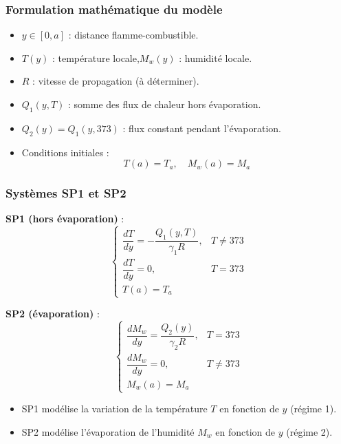 \documentclass[handout]{beamer}
\newtheorem{pbm et hypo}[thm]{Problématique et hypothèses}
\begin{document}
	
	\begin{frame}
		\frametitle{Formulation mathématique du modèle}
		
		\begin{itemize}
			\item $y \in [0,a]$ : distance flamme-combustible.
			\item $T(y)$ : température locale,\quad $M_w(y)$ : humidité locale.
			\item $R$ : vitesse de propagation (à déterminer).
			\item $Q_1(y,T)$ : somme des flux de chaleur hors évaporation.
			\item $Q_2(y) = Q_1(y, 373)$ : flux constant pendant l'évaporation.
			\item Conditions initiales : 
			\[
			T(a) = T_a,\quad M_w(a) = M_a
			\]
		\end{itemize}
	\end{frame}
	
	\begin{frame}
		\frametitle{Systèmes SP1 et SP2}
		
		\begin{minipage}{0.48\linewidth}
			\textbf{SP1 (hors évaporation)} :
			\begin{equation*}
				\begin{cases}
					\dfrac{dT}{dy} = -\dfrac{Q_1(y,T)}{\gamma_1 R}, & T \neq 373 \\[0.4em]
					\dfrac{dT}{dy} = 0, & T = 373 \\[0.4em]
					T(a) = T_a
				\end{cases}
			\end{equation*}
		\end{minipage}
		\hfill
		\begin{minipage}{0.48\linewidth}
			\textbf{SP2 (évaporation)} :
			\begin{equation*}
				\begin{cases}
					\dfrac{dM_w}{dy} = \dfrac{Q_2(y)}{\gamma_2 R}, & T = 373 \\[0.4em]
					\dfrac{dM_w}{dy} = 0, & T \neq 373 \\[0.4em]
					M_w(a) = M_a
				\end{cases}
			\end{equation*}
		\end{minipage}
		
		\vspace{1.5em}
		\begin{itemize}
			\item SP1 modélise la variation de la température $T$ en fonction de $y$ (régime 1). 
			\item SP2 modélise l'évaporation de l'humidité $M_w$ en fonction de $y$ (régime 2).
		\end{itemize}
	\end{frame}
	
\end{document}
